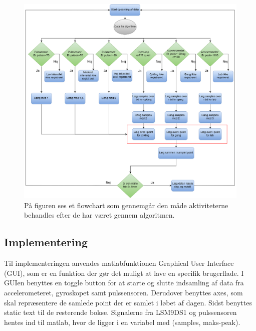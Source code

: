 \begin{figure}[H]
	\centering
	\includegraphics[scale=0.4]{figures/cDesign/pseudo_GUI.png}
	\caption{På figuren ses et flowchart som gennemgår den måde aktiviteterne behandles efter de har været gennem algoritmen.}
	\label{fig:GUI}
\end{figure}

\subsection{Implementering}
Til implementeringen anvendes matlabfunktionen Graphical User Interface (GUI), som er en funktion der gør det muligt at lave en specifik brugerflade. I GUIen benyttes en toggle button for at starte og slutte indsamling af data fra accelerometeret, gyroskopet samt pulssensoren. Derudover benyttes axes, som skal repræsentere de samlede point der er samlet i løbet af dagen. Sidst benyttes static text til de resterende bokse. \newline
Signalerne fra LSM9DS1 og pulssensoren hentes ind til matlab, hvor de ligger i en variabel med (samples, maks-peak).